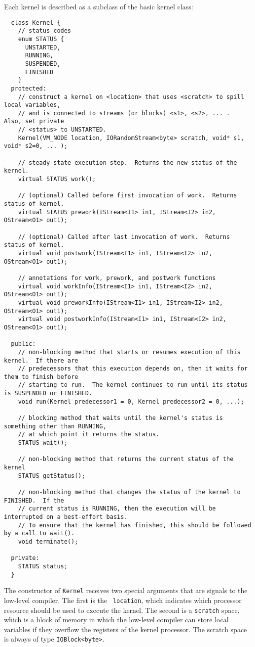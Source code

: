 Each kernel is described as a subclass of the basic kernel class:
{\small
\begin{verbatim}
  class Kernel {
    // status codes
    enum STATUS {
      UNSTARTED,
      RUNNING,
      SUSPENDED,
      FINISHED
    }
  protected:
    // construct a kernel on <location> that uses <scratch> to spill local variables,
    // and is connected to streams (or blocks) <s1>, <s2>, ... .  Also, set private 
    // <status> to UNSTARTED.
    Kernel(VM_NODE location, IORandomStream<byte> scratch, void* s1, void* s2=0, ... );

    // steady-state execution step.  Returns the new status of the kernel.
    virtual STATUS work();

    // (optional) Called before first invocation of work.  Returns status of kernel.
    virtual STATUS prework(IStream<I1> in1, IStream<I2> in2, OStream<O1> out1);

    // (optional) Called after last invocation of work.  Returns status of kernel.
    virtual void postwork(IStream<I1> in1, IStream<I2> in2, OStream<O1> out1);

    // annotations for work, prework, and postwork functions
    virtual void workInfo(IStream<I1> in1, IStream<I2> in2, OStream<O1> out1);
    virtual void preworkInfo(IStream<I1> in1, IStream<I2> in2, OStream<O1> out1);
    virtual void postworkInfo(IStream<I1> in1, IStream<I2> in2, OStream<O1> out1);
   
  public:
    // non-blocking method that starts or resumes execution of this kernel.  If there are 
    // predecessors that this execution depends on, then it waits for them to finish before 
    // starting to run.  The kernel continues to run until its status is SUSPENDED or FINISHED.
    void run(Kernel predecessor1 = 0, Kernel predecessor2 = 0, ...);

    // blocking method that waits until the kernel's status is something other than RUNNING,
    // at which point it returns the status.
    STATUS wait();

    // non-blocking method that returns the current status of the kernel
    STATUS getStatus();

    // non-blocking method that changes the status of the kernel to FINISHED.  If the
    // current status is RUNNING, then the execution will be interrupted on a best-effort basis.
    // To ensure that the kernel has finished, this should be followed by a call to wait().
    void terminate();

  private:
    STATUS status;
  }  
\end{verbatim}}
The constructor of {\tt Kernel} receives two special arguments that
are signals to the low-level compiler.  The first is the {\tt
location}, which indicates which processor resource should be used to
execute the kernel.  The second is a {\tt scratch} space, which is a
block of memory in which the low-level compiler can store local
variables if they overflow the registers of the kernel processor.  The
scratch space is always of type {\tt IOBlock<byte>}.  


